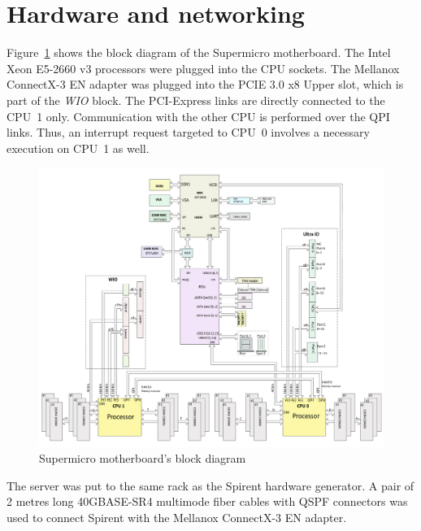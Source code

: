 
\section{Hardware and networking}\label{sec:setup-hardware}
Figure~\ref{fig:setup-supermicro-board} shows the block diagram of the Supermicro motherboard.
The Intel Xeon E5-2660 v3 processors were plugged into the CPU sockets.
The Mellanox ConnectX-3 EN adapter was plugged into the PCIE 3.0 x8 Upper slot,
which is part of the {\it{WIO}} block.
The PCI-Express links are directly connected to the CPU~1 only.
Communication with the other CPU is performed over the QPI links.
Thus, an interrupt request targeted to CPU~0 involves a necessary execution on CPU~1 as well.
\begin{figure}
	\centering
	\includegraphics[width=15cm,keepaspectratio]{fig/supermicro-x10drui.png}
	\caption{Supermicro motherboard's block diagram}
	\label{fig:setup-supermicro-board}
\end{figure}

The server was put to the same rack as the Spirent hardware generator.
A pair of 2 metres long 40GBASE-SR4 multimode fiber cables with QSPF connectors
was used to connect Spirent with the Mellanox ConnectX-3 EN adapter.


